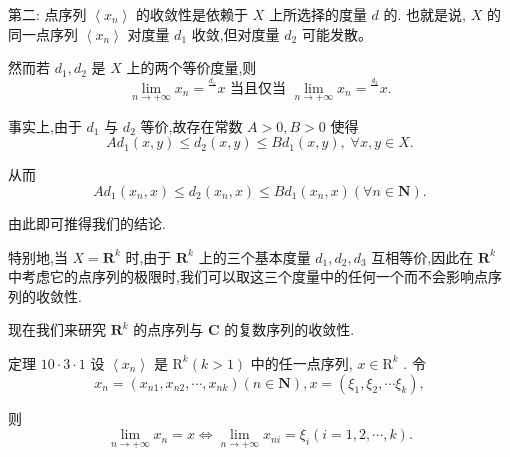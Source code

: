 第二: 点序列 $\left\langle  {x}_{n}\right\rangle$ 的收敛性是依赖于 $X$ 上所选择的度量 $d$ 的. 也就是说, $X$ 的同一点序列 $\left\langle  {x}_{n}\right\rangle$ 对度量 ${d}_{1}$ 收敛,但对度量 ${d}_{2}$ 可能发散。

然而若 ${d}_{1},{d}_{2}$ 是 $X$ 上的两个等价度量,则
$$\mathop{\lim }\limits_{{n \rightarrow   + \infty }}{x}_{n} = {}^{\frac{{d}_{1}}{}}x\text{ 当且仅当 }\mathop{\lim }\limits_{{n \rightarrow   + \infty }}{x}_{n} = {}^{\frac{{d}_{2}}{}}x.$$

事实上,由于 ${d}_{1}$ 与 ${d}_{2}$ 等价,故存在常数 $A > 0,B > 0$ 使得
$$A{d}_{1}\left( {x,y}\right)  \leq  {d}_{2}\left( {x,y}\right)  \leq  B{d}_{1}\left( {x,y}\right) ,\;\forall x,y \in  X.$$

从而
$$A{d}_{1}\left( {{x}_{n},x}\right)  \leq  {d}_{2}\left( {{x}_{n},x}\right)  \leq  B{d}_{1}\left( {{x}_{n},x}\right) \left( {\forall n \in  \mathbf{N}}\right) .$$

由此即可推得我们的结论.

特别地,当 $X = {\mathbf{R}}^{k}$ 时,由于 ${\mathbf{R}}^{k}$ 上的三个基本度量 ${d}_{1},{d}_{2},{d}_{3}$ 互相等价,因此在 ${\mathbf{R}}^{k}$ 中考虑它的点序列的极限时,我们可以取这三个度量中的任何一个而不会影响点序列的收敛性.

现在我们来研究 ${\mathbf{R}}^{k}$ 的点序列与 $\mathbf{C}$ 的复数序列的收敛性.

定理 ${10} \cdot  3 \cdot  1$ 设 $\left\langle  {x}_{n}\right\rangle$ 是 ${\mathrm{R}}^{k}\left( {k > 1}\right)$ 中的任一点序列, $x \in  {\mathrm{R}}^{k}$ . 令
$${x}_{n} = \left( {{x}_{n1},{x}_{n2},\cdots ,{x}_{nk}}\right) \left( {n \in  \mathbf{N}}\right) ,x = \left( {{\xi }_{1},{\xi }_{2},\cdots {\xi }_{k}}\right) ,$$

则
$$\mathop{\lim }\limits_{{n \rightarrow   + \infty }}{x}_{n} = x \Leftrightarrow  \mathop{\lim }\limits_{{n \rightarrow   + \infty }}{x}_{ni} = {\xi }_{i}\left( {i = 1,2,\cdots ,k}\right) .$$

